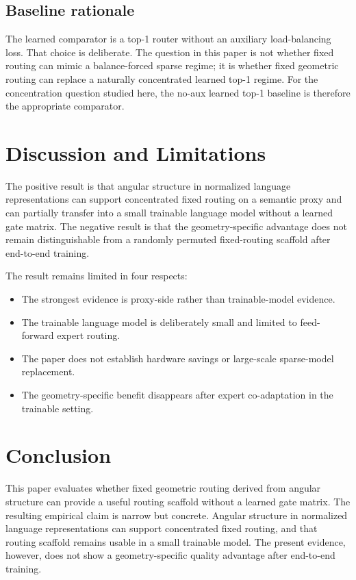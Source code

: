 \documentclass[10pt,twocolumn,letterpaper]{article}
\begin{document}
\subsection{Baseline rationale}
The learned comparator is a top-1 router without an auxiliary load-balancing loss. That choice is deliberate. The question in this paper is not whether fixed routing can mimic a balance-forced sparse regime; it is whether fixed geometric routing can replace a naturally concentrated learned top-1 regime. For the concentration question studied here, the no-aux learned top-1 baseline is therefore the appropriate comparator.

\section{Discussion and Limitations}
The positive result is that angular structure in normalized language representations can support concentrated fixed routing on a semantic proxy and can partially transfer into a small trainable language model without a learned gate matrix. The negative result is that the geometry-specific advantage does not remain distinguishable from a randomly permuted fixed-routing scaffold after end-to-end training.

The result remains limited in four respects:
\begin{itemize}
\item The strongest evidence is proxy-side rather than trainable-model evidence.
\item The trainable language model is deliberately small and limited to feed-forward expert routing.
\item The paper does not establish hardware savings or large-scale sparse-model replacement.
\item The geometry-specific benefit disappears after expert co-adaptation in the trainable setting.
\end{itemize}

\section{Conclusion}
This paper evaluates whether fixed geometric routing derived from angular structure can provide a useful routing scaffold without a learned gate matrix. The resulting empirical claim is narrow but concrete. Angular structure in normalized language representations can support concentrated fixed routing, and that routing scaffold remains usable in a small trainable model. The present evidence, however, does not show a geometry-specific quality advantage after end-to-end training.
\end{document}
